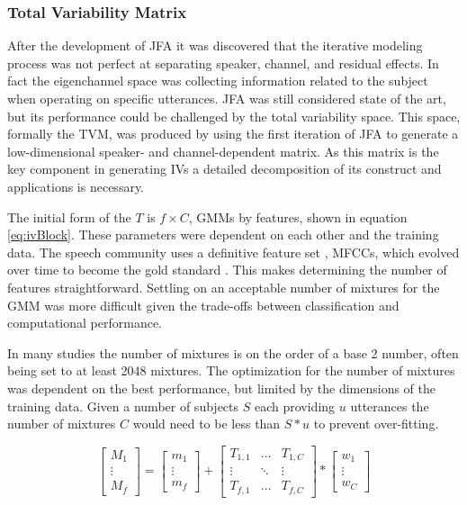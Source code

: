 \subsubsection{Total Variability Matrix}

After the development of \ac{JFA} it was discovered that the iterative modeling process was not perfect at separating speaker, channel, and residual effects\cite{Dehak2011}. In fact the eigenchannel space was collecting information related to the subject when operating on specific utterances. \ac{JFA} was still considered state of the art, but its performance could be challenged by the total variability space. This space, formally the \ac{TVM}, was produced by using the first iteration of \ac{JFA} to generate a low-dimensional speaker- and channel-dependent matrix. As this matrix is the key component in generating \acp{IV} a detailed decomposition of its construct and applications is necessary. 

The initial form of the $T$ is $f \times C$, \acp{GMM} by features, shown in equation \ref{eq:ivBlock}. These parameters were dependent on each other and the training data. The speech community uses a definitive feature set \cite{Davis1980}, \acp{MFCC}, which evolved over time to become the gold standard \cite{Kinnunen2010}. This makes determining the number of features straightforward. Settling on an acceptable number of mixtures for the \ac{GMM} was more difficult given the trade-offs between classification and computational performance\cite{Glembek2011,McClanahan2015}.

In many studies the number of mixtures is on the order of a base 2 number, often being set to at least 2048 mixtures\cite{Garcia-Romero2011,Greenberg2014a}. The optimization for the number of mixtures was dependent on the best performance, but limited by the dimensions of the training data. Given a number of subjects $S$ each providing $u$ utterances the number of mixtures $C$ would need to be less than $S*u$ to prevent over-fitting.

\begin{equation}
\label{eq:ivBlock}
\begin{bmatrix} M_{1} \\ \vdots \\ M_{f} \end{bmatrix} =
\begin{bmatrix} m_{1} \\ \vdots \\ m_{f} \end{bmatrix} +
\begin{bmatrix} T_{1,1} & \dots & T_{1,C} \\ \vdots & \ddots & \vdots \\ T_{f,1} & \dots & T_{f,C} \end{bmatrix} *
\begin{bmatrix} w_{1} \\ \vdots \\ w_{C} \end{bmatrix}
\end{equation}

